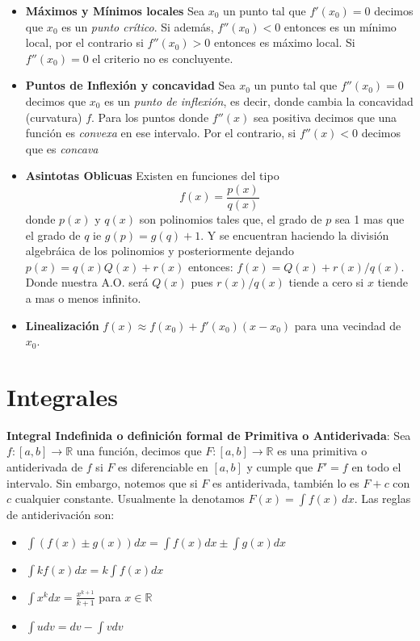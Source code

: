 \documentclass[pdftex,11pt,a4paper]{article}
\begin{document}
\begin{itemize}
    \item \textbf{Máximos y Mínimos locales} Sea $x_0$ un punto tal que $f'(x_0) = 0$ decimos que $x_0$ es un \textit{punto crítico}. Si además, $f''(x_0)<0$ entonces es un mínimo local, por el contrario si $f''(x_0) > 0$ entonces es máximo local. Si $f''(x_0) = 0$ el criterio no es concluyente.
    \item \textbf{Puntos de Inflexión y concavidad} Sea $x_0$ un punto tal que $f''(x_0) = 0$ decimos que $x_0$ es un \textit{punto de inflexión}, es decir, donde cambia la concavidad (curvatura) $f$. Para los puntos donde $f''(x)$ sea positiva decimos que una función es \textit{convexa} en ese intervalo. Por el contrario, si $f''(x) < 0$ decimos que es \textit{concava}
    \item \textbf{Asintotas Oblicuas} Existen en funciones del tipo $$f(x) = \dfrac{p(x)}{q(x)}$$ donde $p(x)$ y $q(x)$ son polinomios tales que, el grado de $p$ sea 1 mas que el grado de $q$ ie $g(p) = g(q) + 1$. Y se encuentran haciendo la división algebráica de los polinomios y posteriormente dejando $p(x) = q(x)Q(x) + r(x)$ entonces: $f(x) = Q(x) + r(x)/q(x)$. Donde nuestra A.O. será $Q(x)$ pues $r(x)/q(x)$ tiende a cero si $x$ tiende a mas o menos infinito.
    \item \textbf{Linealización} $f(x) \approx f(x_0) + f'(x_0)(x-x_0)$ para una vecindad de $x_0$.
\end{itemize}

\section{Integrales}
\textbf{Integral Indefinida o definición formal de Primitiva o Antiderivada}: Sea $f:[a,b]\rightarrow\mathbb{R}$ una función, decimos que $F:[a,b]\rightarrow\mathbb{R}$ es una primitiva o antiderivada de $f$ si $F$ es diferenciable en $[a,b]$ y cumple que $F' = f$ en todo el intervalo. Sin embargo, notemos que si $F$ es antiderivada, también lo es $F + c$ con $c$ cualquier constante. Usualmente la denotamos $F(x) = \int f(x) \, dx$. Las reglas de antiderivación son:
\begin{itemize}
    \item $\int(f(x)\pm g(x))dx = \int f(x) dx \pm \int g(x) dx$
    \item $\int kf(x)dx = k\int f(x) dx$
    \item $\int x^k dx = \frac{x^{k+1}}{k+1}$ para $x\in\mathbb{R}$
    \item $\int u dv = dv - \int v dv$
\end{itemize}
\end{document}
